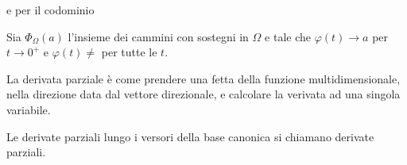 \documentclass[a4paper]{article}
\begin{document}
e per il codominio



Sia \(\Phi_\Omega(a)\) l'insieme dei
cammini con sostegni in \(\Omega\)
e tale che \(\varphi(t) \to a\)
per \(t \to 0^+\)
e \(\varphi(t) \neq\) per tutte le \(t\).




La derivata parziale è come prendere una fetta della funzione multidimensionale,
nella direzione data dal vettore direzionale, e calcolare la verivata ad una singola variabile.

Le derivate parziali lungo i versori della base canonica si chiamano derivate parziali.
\end{document}

